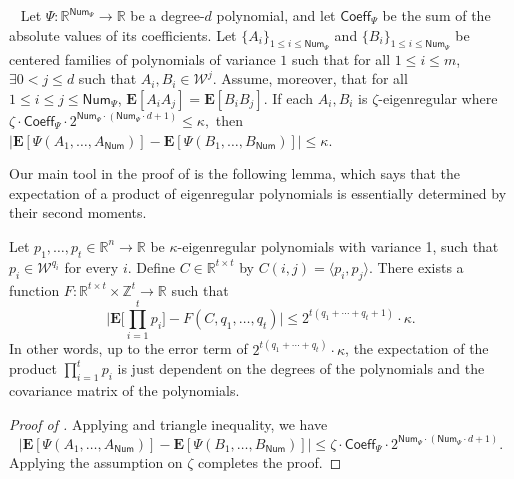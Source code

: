 \documentclass{toc}
\begin{document}
\begin{lemma}~\label{lem:variance-lowerbound}
Let $\Psi:\mathbb{R}^{\mathsf{Num}_\Psi} \rightarrow \mathbb{R}$ be a
degree-$d$ polynomial, and let $\mathsf{Coeff}_\Psi$ be the sum of the absolute
values of its coefficients.
Let $\{A_i\}_{1 \le i \le
\mathsf{Num}_\Psi}$ and $\{B_i \}_{1 \le i \le \mathsf{Num}_\Psi}$  be centered
families of polynomials of variance $1$ such that for all $1 \le i \le m$,
$\exists 0< j \le d$ such that $A_i, B_i \in \mathcal{W}^j$. Assume, moreover, that for all
$1 \le i \le j \le \mathsf{Num}_\Psi$, $\mathbf{E}[A_i A_j] = \mathbf{E}[B_i
B_j]$. If each $A_i, B_i$ is $\zeta$-eigenregular where 
$
\zeta \cdot \mathsf{Coeff}_\Psi \cdot 2^{\mathsf{Num}_\Psi \cdot (\mathsf{Num}_\Psi \cdot d+1)} \leq \kappa, 
$
then $|\mathbf{E}[\Psi(A_1, \ldots, A_{\mathsf{Num}})] - \mathbf{E}[\Psi(B_1, \ldots, B_{\mathsf{Num}})]| \le \kappa$. 
\end{lemma}

Our main tool in the proof of  is the following lemma,
which says that the expectation of a product of eigenregular polynomials is essentially
determined by their second moments.

\begin{lemma}\label{lem:monomial}
    Let $p_1, \ldots, p_t \in \mathbb{R}^n \rightarrow \mathbb{R}$ be $\kappa$-eigenregular polynomials with variance 1, such that $p_i \in \mathcal{W}^{q_i}$ for every $i$.
    Define $C \in \mathbb{R}^{t \times t}$ by $C(i,j) = \langle p_i, p_j \rangle$. 
There exists a function $F : \mathbb{R}^{t \times t} \times \mathbb{Z}^{t} \rightarrow \mathbb{R}$ such that 
\[
\bigg| \mathbf{E}\big[\prod_{i=1}^t p_i \big] - F(C, q_1, \ldots, q_t) \bigg| \le  2^{t (q_1 + \cdots + q_t+1)} \cdot \kappa. 
\]
In other words, up to the error term of $2^{t (q_1 + \cdots + q_t)} \cdot \kappa$, the expectation of the product $\prod_{i=1}^t p_i$ is just dependent on the degrees of the polynomials and the covariance matrix of the polynomials. 
\end{lemma}

\begin{proof}[Proof of ]
Applying  and triangle inequality, we have
$$
|\mathbf{E}[\Psi(A_1, \ldots, A_{\mathsf{Num}})] - \mathbf{E}[\Psi(B_1, \ldots, B_{\mathsf{Num}})]|  \le \zeta \cdot\mathsf{Coeff}_\Psi \cdot 2^{\mathsf{Num}_\Psi \cdot (\mathsf{Num}_\Psi \cdot d+1)}. 
$$
Applying the assumption on $\zeta$ completes the proof.
\end{proof}
\end{document}
